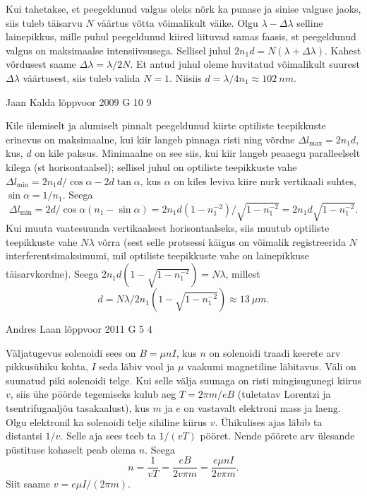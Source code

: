 \documentclass[11pt]{article}
\begin{document}
{{Kui tahetakse, et peegeldunud valgus oleks nõrk ka punase ja sinise valguse jaoks, siis tuleb täisarvu $N$ väärtus võtta võimalikult väike. Olgu $\lambda - \Delta \lambda $ selline lainepikkus, mille puhul peegeldunud kiired liituvad samas faasis, st peegeldunud valgus on maksimaalse intensiivsusega. Sellisel juhul $2n_1d = N(\lambda + \Delta \lambda )$. Kahest võrdusest saame $\Delta \lambda = \lambda /2N$. Et antud juhul oleme huvitatud võimalikult suurest $\Delta \lambda$ väärtusest, siis tuleb valida $N = 1$. Niisiis $d = \lambda /4n_1 \approx \SI{102}{nm}$.
\fi
}

{Jaan Kalda} %
{lõppvoor} %
{2009} %
{G 10} %
{9} %
{

\ifSolution
Kile ülemiselt ja alumiselt pinnalt peegeldunud kiirte optiliste teepikkuste erinevus on maksimaalne, kui
kiir langeb pinnaga risti ning võrdne $\Delta l_{\max}=2n_1d$, kus, $d$ on kile paksus. Minimaalne on see siis, kui kiir langeb peaaegu paralleelselt kilega (st horisontaalsel); sellisel juhul on optiliste teepikkuste vahe $\Delta l_{\min}=2n_1d/\cos\alpha-2d\tan\alpha$, kus $\alpha$ on kiles leviva kiire nurk vertikaali suhtes, $\sin\alpha=1/n_1$. Seega 
\[
\Delta l_{\min}=2d/\cos\alpha(n_1-\sin\alpha)=2n_1d(1-n_1^{-2})/\sqrt{1-n_1^{-2}}=2n_1d\sqrt{1-n_1^{-2}}.
\]
Kui muuta vaatesuunda vertikaalsest horisontaalseks, siis muutub optiliste teepikkuste vahe $N\lambda$ võrra (sest selle protsessi käigus on võimalik registreerida $N$ interferentsimaksimumi, mil optiliste teepikkuste vahe on lainepikkuse täisarvkordne). Seega
$2n_1d(1-\sqrt{1-n_1^{-2}})=N\lambda$, millest $$d=N\lambda/2n_1(1-\sqrt{1-n_1^{-2}})\approx \SI{13}{\mu m}.$$
\fi
}

{Andres Laan} %
{lõppvoor} %
{2011} %
{G 5} %
{4} %
{

\ifSolution
Väljatugevus solenoidi sees on $B=\mu nI$, kus $n$ on solenoidi traadi keerete arv pikkusühiku kohta, $I$ seda läbiv vool ja $\mu$ vaakumi magnetiline läbitavus. Väli on suunatud piki solenoidi telge. Kui selle välja suunaga on risti mingisugunegi kiirus $v$, siis ühe pöörde tegemiseks kulub aeg $T=2\pi m/eB$ (tuletatav Lorentzi ja tsentrifugaaljõu tasakaalust), kus $m$ ja $e$ on vastavalt elektroni mass ja laeng. Olgu elektronil ka solenoidi telje sihiline kiirus $v$. Ühikulises ajas läbib ta distantsi $1/v$. Selle aja sees teeb ta $1/(vT)$ pööret. Nende pöörete arv ülesande püstituse kohaselt peab olema $n$. Seega
\[
n=\frac{1}{vT}=\frac{eB}{2v\pi m}=\frac{e\mu nI}{2v\pi m}.
\]
Siit saame $v=e\mu I/(2\pi m)$.

}}
\end{document}
